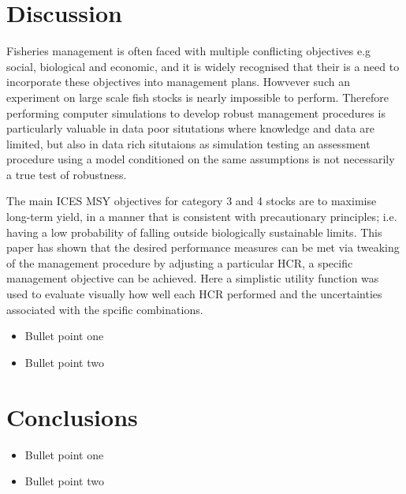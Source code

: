 \documentclass[preprint,12pt]{elsarticle}
\begin{document}
\section{Discussion}

Fisheries management is often faced with multiple conflicting objectives e.g social, biological and economic, and it is widely recognised that their is a need to incorporate these objectives into management plans. Howvever such an experiment on large scale fish stocks is nearly impossible to perform.  Therefore performing computer simulations to develop robust management procedures is particularly valuable in data poor situtations where knowledge and data are limited, but also in data rich situtaions as simulation testing an assessment procedure using a model conditioned on the same assumptions is not necessarily a true test of robustness.  

The main ICES MSY objectives for category 3 and 4 stocks are to maximise long-term yield, in a manner that is consistent with precautionary principles; i.e. having a low probability of falling outside biologically sustainable limits.  This paper has shown that the desired performance measures can be met via tweaking of the management procedure by adjusting a particular HCR, a specific management objective can be achieved. Here a simplistic utility function was used to evaluate visually how well each HCR performed and the uncertainties associated with the spcific combinations.



\begin{itemize}
\item Bullet point one
\item Bullet point two
\end{itemize}

\section{Conclusions}


\begin{itemize}
\item Bullet point one
\item Bullet point two
\end{itemize}
\end{document}
